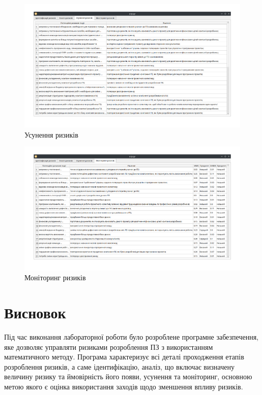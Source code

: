 \documentclass[14pt]{extreport}
\begin{document}
\begin{normalsize}
	\begin{figure}[H]
		\centering
		\includegraphics[scale=0.45]{5}
		\caption{Усунення ризиків}
	\end{figure}
	
	\begin{figure}[H]
		\centering
		\includegraphics[scale=0.45]{6}
		\caption{Моніторинг ризиків}
	\end{figure}
	
	\section*{Висновок}
	Під час виконання лабораторної роботи було розроблене програмне забезпечення, яке дозволяє управляти ризиками розроблення ПЗ з використанням математичного методу. Програма характеризує всі деталі проходження етапів розроблення ризиків, а саме ідентифікацію, аналіз, що включає визначену величину ризику та ймовірність його появи, усунення та моніторинг, основною метою якого є оцінка використання заходів щодо зменшення впливу ризиків.
	
\end{normalsize}
\end{document}
